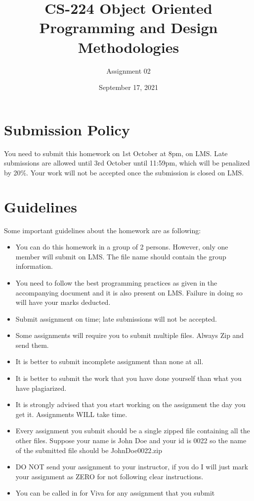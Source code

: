 \documentclass[a4paper,12pt]{article}
\begin{document}
	
	\title{CS-224 Object Oriented Programming and Design Methodologies }
	\author{Assignment 02}
	\date{September 17, 2021}
	\maketitle
	\section{Submission Policy}
You need to submit this homework on  {\color{blue}1st October at 8pm}, on LMS. Late submissions are allowed until {\color{red} 3rd October until 11:59pm}, which will be penalized by 20\%. Your work will not be accepted once the submission is closed on LMS.

\section{Guidelines}
Some important guidelines about the homework are as following:
\begin{itemize}
	\item You can do this homework in a group of 2 persons. However, only one member will submit on LMS. The file name should contain the group information.
	
	\item You need to follow the best programming practices as given in the accompanying document and it is also present on LMS. Failure in doing so will have your marks deducted.
	\item Submit assignment on time; late submissions will not be accepted.
	\item Some assignments will require you to submit multiple files. Always Zip and send them.
	\item It is better to submit incomplete assignment than none at all.
	\item It is better to submit the work that you have done yourself than what you have plagiarized.
	\item It is strongly advised that you start working on the assignment the day you get it. Assignments WILL take time.
	\item Every assignment you submit should be a single zipped file containing all the other files. Suppose your name is John Doe and your id is 0022 so the name of the submitted file should be JohnDoe0022.zip
	\item DO NOT send your assignment to your instructor, if you do I will just mark your assignment as ZERO for not following clear instructions.
	\item You can be called in for Viva for any assignment that you submit
\end{itemize}
\end{document}

